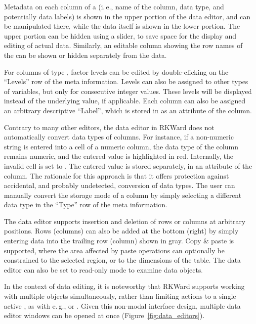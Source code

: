 Metadata on each column of a  (i.\,e., name of the column, data
type, and potentially data labels) is shown in the upper portion of
the data editor, and can be manipulated there, while the data itself is
shown in the lower portion. The upper portion can be hidden using a
slider, to save space for the display and editing of actual data.
Similarly, an editable column showing the row names of the 
can be shown or hidden separately from the data.

For columns of type , factor levels can be edited by double-clicking on the
``Levels'' row of the meta information. Levels can also be assigned to other types of
variables, but only for consecutive integer values. These levels will
be displayed instead of the underlying value, if applicable. Each
column can also be assigned an arbitrary descriptive
``Label'', which is stored in
 as an attribute of the column.

Contrary to many other editors, the data editor in RKWard does not
automatically convert data types of columns. For instance, if a
non-numeric string is entered into a cell of a numeric column, the data
type of the column remains numeric, and the entered value is
highlighted in red. Internally, the invalid cell is set to .
The entered value is stored separately, in an attribute of the column.
The rationale for this approach is that it offers protection against
accidental, and probably undetected, conversion of data types. The
user can manually convert the storage mode of a column by simply
selecting a different data type in the ``Type'' row of the meta information.

The data editor supports insertion and deletion of rows or columns at 
arbitrary positions. Rows (columns) can also be added at the bottom 
(right) by simply entering data into the trailing row (column) shown in
gray. Copy \& paste is supported, where the area affected by paste
operations can optionally be constrained to the selected region, or to
the dimensions of the table. The data editor can also be set to read-only
mode to examine data objects.

In the context of data editing, it is noteworthy that
RKWard supports working with multiple objects simultaneously, rather than
limiting actions to a single active , as with e.\,g.,  or
. Given this non-modal interface design, multiple data editor
windows can be opened at once (Figure~\ref{fig:data_editors}).


